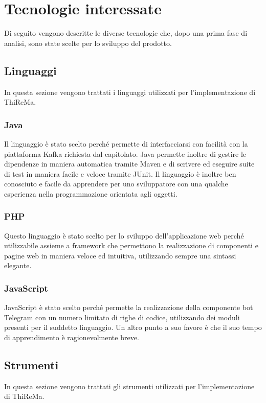 \section{Tecnologie interessate}
	Di seguito vengono descritte le diverse tecnologie che, dopo una prima fase di analisi, sono state scelte per lo sviluppo del prodotto.
	\subsection{Linguaggi}
		In questa sezione vengono trattati i linguaggi utilizzati per l'implementazione di ThiReMa.
		\subsubsection{Java}
			Il linguaggio è stato scelto perché permette di interfacciarsi con facilità con la piattaforma Kafka richiesta dal capitolato. Java permette inoltre di gestire le dipendenze in maniera automatica tramite Maven e di scrivere ed eseguire suite di test in maniera facile e veloce tramite JUnit.
			\newline
			Il linguaggio è inoltre ben conosciuto e facile da apprendere per uno sviluppatore con una qualche esperienza nella programmazione orientata agli oggetti. 
		\subsubsection{PHP}
			Questo linguaggio è stato scelto per lo sviluppo dell'applicazione web perché utilizzabile assieme a framework che permettono la realizzazione di componenti e pagine web in maniera veloce ed intuitiva, utilizzando sempre una sintassi elegante.
		\subsubsection{JavaScript}
			JavaScript è stato scelto perché permette la realizzazione della componente bot Telegram con un numero limitato di righe di codice, utilizzando dei moduli presenti per il suddetto linguaggio.
			\newline
			Un altro punto a suo favore è che il suo tempo di apprendimento è ragionevolmente breve.
	\subsection{Strumenti}
		In questa sezione vengono trattati gli strumenti utilizzati per l'implementazione di ThiReMa.
